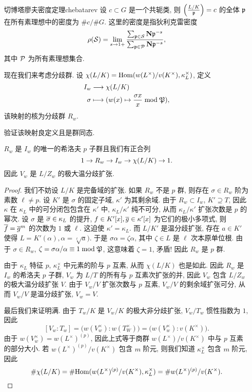 \begin{theorem}{切博塔廖夫密度定理}{chebatarev}
设 $c\subset G$ 是一个共轭类, 则 $\left(\frac{{L/K}}{{\mathfrak{p}}}\right)=c$ 的全体 ${\mathfrak{p}}$ 在所有素理想中的密度为 $\#c/\#G$. 这里的密度是指狄利克雷密度
	\[\rho({\mathcal{S}})=\lim_{s\to 1+}\frac{\sum_{{\mathfrak{p}}\in {\mathcal{S}}}{\mathbf{N}}{\mathfrak{p}}^{-s}}{\sum_{{\mathfrak{p}}\in {\mathcal{P}}}{\mathbf{N}}{\mathfrak{p}}^{-s}},\]
其中 ${\mathcal{P}}$ 为所有素理想集合.
\end{theorem}



现在我们来考虑分歧群.
设 $\chi(L/K)={\mathrm{Hom}}(w(L^\times)/v(K^\times),\kappa_L^\times)$, 定义
  \[\begin{split}I_w &\longrightarrow \chi(L/K) \\ \sigma &\longmapsto (w(x)\mapsto \frac{\sigma x}{x}\bmod{\mathfrak{P}}),\end{split}\]
该映射的核为分歧群 $R_w$.

\begin{exercise}
验证该映射良定义且是群同态.
\end{exercise}

\begin{proposition}{}{}
$R_w$ 是 $I_w$ 的唯一的希洛夫 $p$ 子群且我们有正合列
  \[1\rightarrow R_w\rightarrow I_w \rightarrow \chi(L/K)\rightarrow 1.\]
因此 $V_w$ 是 $L/Z_w$ 的极大温分歧扩张.
\end{proposition}
\begin{proof}
我们不妨设 $L/K$ 是完备域的扩张. 如果 $R_w$ 不是 $p$ 群, 则存在 $\sigma\in R_w$ 阶为素数 $\ell\neq p$. 设 $K'$ 是 $\sigma$ 的固定子域, $\kappa'$ 为其剩余域. 由于 $R_w\subset I_w$, $K'\supseteq T$, 因此 $\kappa$ 在 $\kappa_L$ 中的可分闭包包含在 $\kappa'$ 中, $\kappa_L/\kappa'$ 纯不可分, 从而 $\kappa_L/\kappa'$ 扩张次数是 $p$ 的幂次. 设 $\sigma$ 是 $\overline\sigma\in \kappa_L$ 的提升, $f\in K'[x], \overline g\in \kappa'[x]$ 为它们的极小多项式, 则 $\overline f=\overline g^m$ 的次数为 $1$ 或 $\ell$. 这迫使 $\kappa'=\kappa_L$. 而 $L/K'$ 是温分歧扩张, 存在 $a\in K'$ 使得  $L=K'(\alpha),\alpha=\sqrt[\ell]{a})$. 于是 $\sigma\alpha=\zeta\alpha$, 其中 $\zeta\in L$ 是 $\ell$ 次本原单位根. 由于 $\sigma \in R_w$, $\zeta=\sigma \alpha/\alpha\equiv 1\bmod {\mathfrak{P}}$, 这意味着 $\zeta=1$, 矛盾! 因此 $R_w$ 是 $p$ 群.

由于 $\kappa_L$ 特征 $p$, $\kappa_L^\times$ 中元素的阶与 $p$ 互素, 从而 $\chi(L/K)$ 也是如此. 因此 $R_w$ 是 $I_w$ 的希洛夫 $p$ 子群, $V_w$ 为 $L/T$ 的所有与 $p$ 互素次扩张的并, 因此 $V_w$ 包含 $L/Z_w$ 的极大温分歧扩张 $V$.  由于 $V_w/V$ 扩张次数与 $p$ 互素, $V_w/V$ 的剩余域扩张可分, 从而 $V_w/V$ 是温分歧扩张, $V_w=V$.

最后我们来证明满. 由于 $T_w/K$ 是 $V_w/K$ 的极大非分歧扩张, $V_w/T_w$ 惯性指数为 $1$, 因此
  \[ [V_w:T_w]=\bigl(w(V_w^\times):w(T_W^\times)\bigr) =\bigl(w(V_w^\times):v(K^\times)\bigr).\]
由于 $w(V_w^\times)=w(L^\times)^{(p)}$, 因此上式等于商群 $w(L^\times)/v(K^\times)$ 中与 $p$ 互素的部分大小. 若 $w(L^\times)^{(p)}/v(K^\times)$ 包含 $m$ 阶元, 则我们知道 $\kappa_L^\times$ 包含 $m$ 阶元, 因此
  \[\#\chi(L/K)=\#{\mathrm{Hom}}(w(L^\times)^{(p)}/v(K^\times),\kappa_L^\times)=\#w(L^\times)^{(p)}/v(K^\times).\]
\end{proof}

